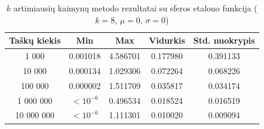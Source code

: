 \begin{table}[H]
    \centering
    \begin{tabular}{|c|c|c|c|c|}
        \hline
        \textbf{Taškų kiekis} & \textbf{Min} & \textbf{Max} & \textbf{Vidurkis} & \textbf{Std. nuokrypis} \\ \hline
        1 000        & 0.001018 & 4.586701 & 0.177980 & 0.391133 \\ \hline
        10 000       & 0.000134 & 1.029306 & 0.072264 & 0.068226 \\ \hline
        100 000      & 0.000002 & 1.511709 & 0.035817 & 0.034174 \\ \hline
        1 000 000    & $<10^{-6}$ & 0.496534 & 0.018524 & 0.016519 \\ \hline
        10 000 000   & $<10^{-6}$ & 1.111301 & 0.010020 & 0.009094 \\ \hline
    \end{tabular}
    \caption{$k$ artimiausių kaimynų metodo rezultatai su sferos etalono funkcija ($k = 8$, $\mu = 0$, $\sigma = 0$)}
\end{table}